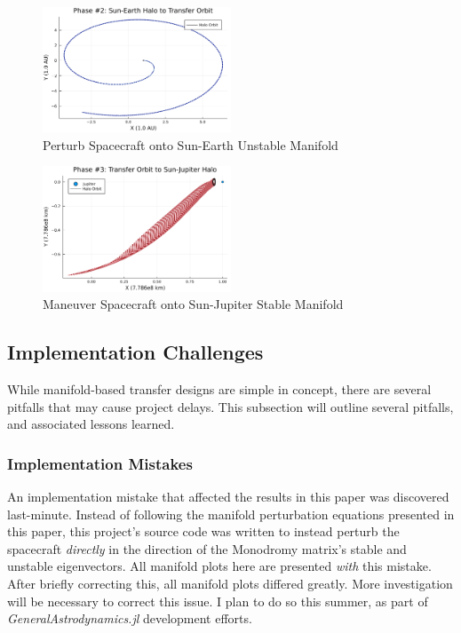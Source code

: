 \documentclass[conf]{new-aiaa}
\begin{document}
\begin{multicols*}{2}
\begin{figure}[H]
    \hskip -0.3cm
    \includegraphics[width=0.5\textwidth]{manifold_transfer_phase2.png}
    \caption{Perturb Spacecraft onto Sun-Earth Unstable Manifold}
\end{figure}

\begin{figure}[H]
    \hskip -0.3cm
    \includegraphics[width=0.5\textwidth]{manifold_transfer_phase3.png}
    \caption{Maneuver Spacecraft onto Sun-Jupiter Stable Manifold}
\end{figure}

\subsection{Implementation Challenges}
While manifold-based transfer designs are simple in concept, there 
are several pitfalls that may cause project delays. This subsection 
will outline several pitfalls, and associated lessons learned.

\subsubsection*{Implementation Mistakes}
An implementation mistake that affected the results in this paper
was discovered last-minute. Instead of following the manifold 
perturbation equations presented in this paper, this project's 
source code was written to instead perturb the spacecraft 
\textit{directly} in the direction of the Monodromy matrix's
stable and unstable eigenvectors. All manifold plots here 
are presented \textit{with} this mistake. After briefly correcting this, 
all manifold plots differed greatly. More investigation will be 
necessary to correct this issue. I plan to do so this summer, as 
part of \textit{GeneralAstrodynamics.jl} development efforts.


\end{multicols*}
\end{document}
